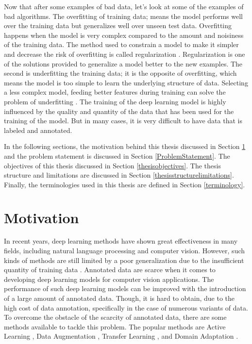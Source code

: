 Now that after some examples of bad data, let's look at some of the examples of bad algorithms. The overfitting of training data; means the model performs well over the training data but generalizes well over unseen test data. Overfitting happens when the model is very complex compared to the amount and noisiness of the training data.  The method used to constrain a model to make it simpler and decrease the risk of overfitting is called regularization \cite{kukacka2017regularization}. Regularization is one of the solutions provided to generalize a model better to the new examples. The second is underfitting the training data; it is the opposite of overfitting, which means the model is too simple to learn the underlying structure of data. Selecting a less complex model, feeding better features during training can solve the problem of underfitting \cite{10.5555/3153997}. The training of the deep learning model is highly influenced by the quality and quantity of the data that has been used for the training of the model. But in many cases, it is very difficult to have data that is labeled and annotated. 


In the following sections, the motivation behind this thesis discussed in Section \ref{motivation} and the problem statement is discussed in Section \ref{ProblemStatement}. The objectives of this thesis discussed in Section \ref{thesisobjectives}. The thesis structure and limitations are discussed in Section \ref{thesisstructurelimitations}. Finally, the terminologies used in this thesis are defined in Section \ref{terminology}.



\section{Motivation}\label{motivation}

In recent years, deep learning methods have shown great effectiveness in many fields, including natural language processing and computer vision. However, such kinds of methods are still limited by a poor generalization due to the insufficient quantity of training data \cite{8978087}. Annotated data are scarce when it comes to developing deep learning models for computer vision applications. The performance of such deep learning models can be improved with the introduction of a large amount of annotated data. Though, it is hard to obtain, due to the high cost of data annotation, specifically in the case of numerous variants of data. To overcome the obstacle of the scarcity of annotated data, there are some methods available to tackle this problem. The popular methods are Active Learning \cite{hemmer2020deal}, Data Augmentation \cite{Shorten.2019}, Transfer Learning \cite{zhuang2020comprehensive}, and Domain Adaptation \cite{redko2020survey}. 

